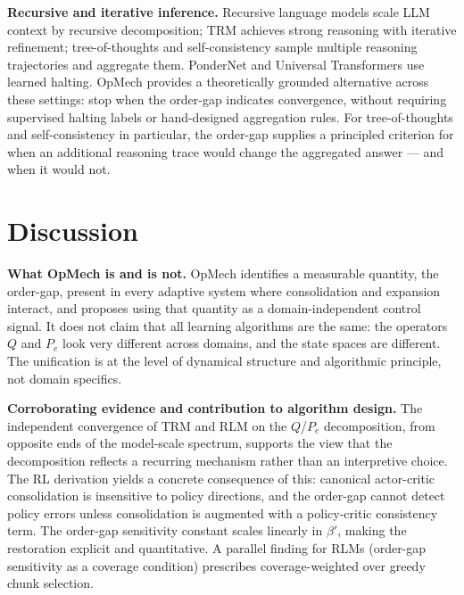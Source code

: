 \documentclass[12pt,a4paper]{article}
\begin{document}
\textbf{Recursive and iterative inference.}
Recursive language models \citep{zhang2025rlm} scale LLM context by recursive
decomposition; TRM \citep{jolicoeurmartineau2025trm} achieves strong
reasoning with iterative refinement; tree-of-thoughts
\citep{yao2023tot} and self-consistency \citep{wang2023selfconsistency}
sample multiple reasoning trajectories and aggregate them. PonderNet
\citep{banino2021pondernet} and Universal Transformers
\citep{dehghani2019universal} use learned halting. OpMech provides a
theoretically grounded alternative across these settings: stop when the
order-gap indicates convergence, without requiring supervised halting
labels or hand-designed aggregation rules. For tree-of-thoughts and
self-consistency in particular, the order-gap supplies a principled
criterion for when an additional reasoning trace would change the
aggregated answer — and when it would not.

\section{Discussion}
\label{sec:discussion}

\textbf{What OpMech is and is not.}
OpMech identifies a measurable quantity, the order-gap, present in every
adaptive system where consolidation and expansion interact, and proposes using
that quantity as a domain-independent control signal. It does not claim that
all learning algorithms are the same: the operators $Q$ and $P_e$ look very
different across domains, and the state spaces are different. The unification
is at the level of dynamical structure and algorithmic principle, not domain
specifics.

\textbf{Corroborating evidence and contribution to algorithm design.}
The independent convergence of TRM and RLM on the $Q$/$P_e$ decomposition,
from opposite ends of the model-scale spectrum, supports the view that the
decomposition reflects a recurring mechanism rather than an interpretive
choice. The RL derivation yields a concrete consequence of this: canonical
actor-critic consolidation is insensitive to policy directions, and the
order-gap cannot detect policy errors unless consolidation is augmented with
a policy-critic consistency term. The order-gap sensitivity constant scales
linearly in $\beta'$, making the restoration explicit and quantitative. A
parallel finding for RLMs (order-gap sensitivity as a coverage
condition) prescribes coverage-weighted over greedy chunk selection.
\end{document}

